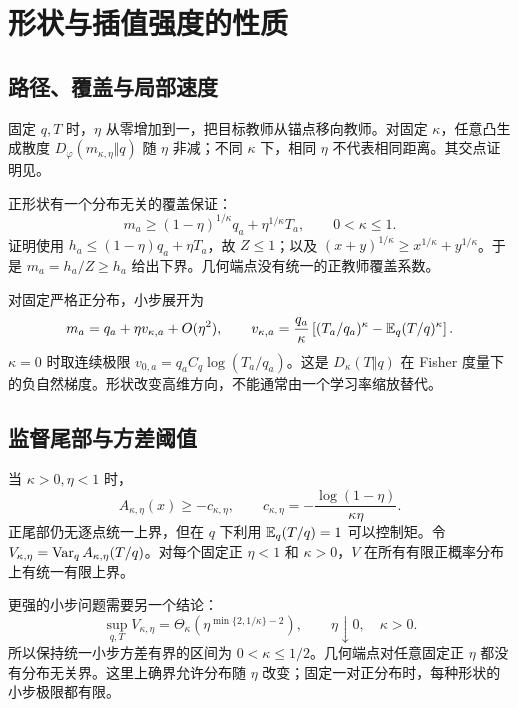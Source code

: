\chapter{形状与插值强度的性质}
\label{ch:parameters}
\section{路径、覆盖与局部速度}
固定 $q,T$ 时，$\eta$ 从零增加到一，把目标教师从锚点移向教师。对固定 $\kappa$，任意凸生成散度 $D_\varphi(m_{\kappa,\eta}\Vert q)$ 随 $\eta$ 非减；不同 $\kappa$ 下，相同 $\eta$ 不代表相同距离。其交点证明见。

正形状有一个分布无关的覆盖保证：
\begin{equation}
m_a\ge(1-\eta)^{1/\kappa}q_a+\eta^{1/\kappa}T_a,\qquad 0<\kappa\le1.
\label{eq:coverage-main}
\end{equation}
证明使用 $h_a\le(1-\eta)q_a+\eta T_a$，故 $Z\le1$；以及 $(x+y)^{1/\kappa}\ge x^{1/\kappa}+y^{1/\kappa}$。于是 $m_a=h_a/Z\ge h_a$ 给出下界。几何端点没有统一的正教师覆盖系数。

对固定严格正分布，小步展开为
\begin{equation}
m_a=q_a+\eta v_{\kappa,a}+O(\eta^2),\qquad
v_{\kappa,a}=\frac{q_a}{\kappa}
\left[(T_a/q_a)^\kappa-\mathbb E_q(T/q)^\kappa\right].
\label{eq:velocity-main}
\end{equation}
$\kappa=0$ 时取连续极限 $v_{0,a}=q_aC_q\log(T_a/q_a)$。这是 $D_\kappa(T\Vert q)$ 在 Fisher 度量下的负自然梯度。形状改变高维方向，不能通常由一个学习率缩放替代。

\section{监督尾部与方差阈值}
当 $\kappa>0,\eta<1$ 时，
\begin{equation}
A_{\kappa,\eta}(x)\ge-c_{\kappa,\eta},\qquad
c_{\kappa,\eta}=-\frac{\log(1-\eta)}{\kappa\eta}.
\end{equation}
正尾部仍无逐点统一上界，但在 $q$ 下利用 $\mathbb E_q(T/q)=1$ 可以控制矩。令 $V_{\kappa,\eta}=\operatorname{Var}_q A_{\kappa,\eta}(T/q)$。对每个固定正 $\eta<1$ 和 $\kappa>0$，$V$ 在所有有限正概率分布上有统一有限上界。

更强的小步问题需要另一个结论：
\begin{equation}
\sup_{q,T}V_{\kappa,\eta}
=\Theta_\kappa\!\left(\eta^{\min\{2,1/\kappa\}-2}\right),
\qquad \eta\downarrow0,\quad\kappa>0.
\label{eq:variance-threshold-main}
\end{equation}
所以保持统一小步方差有界的区间为 $0<\kappa\le1/2$。几何端点对任意固定正 $\eta$ 都没有分布无关界。这里上确界允许分布随 $\eta$ 改变；固定一对正分布时，每种形状的小步极限都有限。

